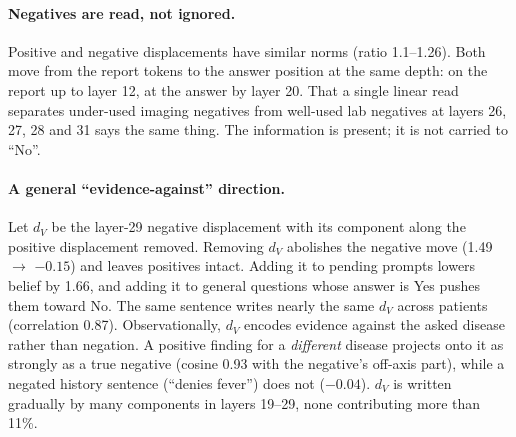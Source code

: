 \documentclass[10pt]{article}
\begin{document}
\paragraph{Negatives are read, not ignored.} Positive and negative displacements have similar norms (ratio 1.1--1.26). Both move from the report tokens to the answer position at the same depth: on the report up to layer 12, at the answer by layer 20. That a single linear read separates under-used imaging negatives from well-used lab negatives at layers 26, 27, 28 and 31 says the same thing. The information is present; it is not carried to ``No''.

\paragraph{A general ``evidence-against'' direction.} Let $d_V$ be the layer-29 negative displacement with its component along the positive displacement removed. Removing $d_V$ abolishes the negative move (1.49 $\to$ $-0.15$) and leaves positives intact. Adding it to pending prompts lowers belief by 1.66, and adding it to general questions whose answer is Yes pushes them toward No. The same sentence writes nearly the same $d_V$ across patients (correlation 0.87). Observationally, $d_V$ encodes evidence against the asked disease rather than negation. A positive finding for a \emph{different} disease projects onto it as strongly as a true negative (cosine 0.93 with the negative's off-axis part), while a negated history sentence (``denies fever'') does not ($-0.04$). $d_V$ is written gradually by many components in layers 19--29, none contributing more than 11\%.
\end{document}
